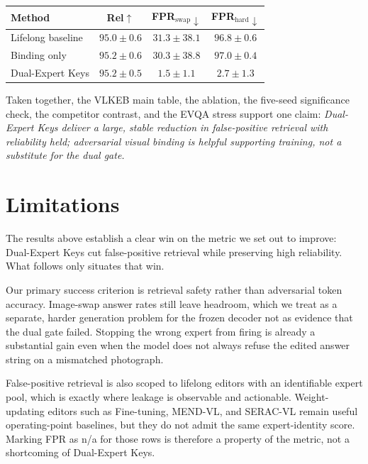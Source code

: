 \documentclass[letterpaper]{article} %
\begin{document}
\begin{center}
\small
\begin{tabular}{@{}lccc@{}}
\toprule
Method & Rel$\uparrow$ & FPR$_{\mathrm{swap}}\downarrow$ & FPR$_{\mathrm{hard}}\downarrow$ \\
\midrule
Lifelong baseline & $95.0{\pm}0.6$ & $31.3{\pm}38.1$ & $96.8{\pm}0.6$ \\
Binding only & $95.2{\pm}0.6$ & $30.3{\pm}38.8$ & $97.0{\pm}0.4$ \\
Dual-Expert Keys & $\mathbf{95.2{\pm}0.5}$ & $\mathbf{1.5{\pm}1.1}$ & $\mathbf{2.7{\pm}1.3}$ \\
\bottomrule
\end{tabular}
\label{tab:evqa}
\end{center}

Taken together, the VLKEB main table, the ablation, the five-seed significance check, the competitor contrast, and the EVQA stress support one claim:
\emph{Dual-Expert Keys deliver a large, stable reduction in false-positive retrieval with reliability held; adversarial visual binding is helpful supporting training, not a substitute for the dual gate.}

\section{Limitations}
The results above establish a clear win on the metric we set out to improve: Dual-Expert Keys cut false-positive retrieval while preserving high reliability.
What follows only situates that win.

Our primary success criterion is retrieval safety rather than adversarial token accuracy.
Image-swap answer rates still leave headroom, which we treat as a separate, harder generation problem for the frozen decoder not as evidence that the dual gate failed.
Stopping the wrong expert from firing is already a substantial gain even when the model does not always refuse the edited answer string on a mismatched photograph.

False-positive retrieval is also scoped to lifelong editors with an identifiable expert pool, which is exactly where leakage is observable and actionable.
Weight-updating editors such as Fine-tuning, MEND-VL, and SERAC-VL remain useful operating-point baselines, but they do not admit the same expert-identity score.
Marking FPR as n/a for those rows is therefore a property of the metric, not a shortcoming of Dual-Expert Keys.
\end{document}
